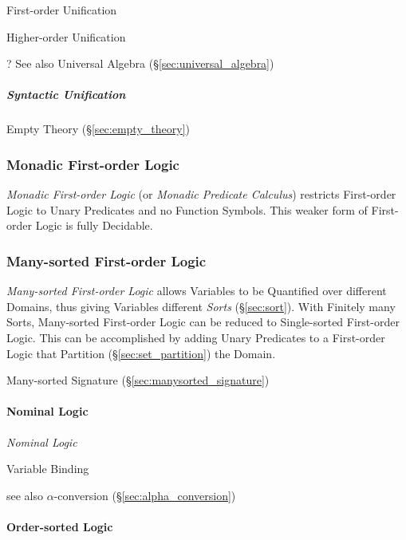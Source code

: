 First-order Unification

Higher-order Unification

\fist ? See also Universal Algebra (\S\ref{sec:universal_algebra})



\subparagraph{Syntactic Unification}\label{sec:syntactic_unification}
\hfill

Empty Theory (\S\ref{sec:empty_theory})



\subsubsection{Monadic First-order Logic}\label{sec:monadic_firstorder}

\emph{Monadic First-order Logic} (or \emph{Monadic Predicate
  Calculus}) restricts First-order Logic to Unary Predicates and no
Function Symbols. This weaker form of First-order Logic is fully
Decidable.



\subsubsection{Many-sorted First-order Logic}
\label{sec:manysorted_logic}

\emph{Many-sorted First-order Logic} allows Variables to be Quantified
over different Domains, thus giving Variables different \emph{Sorts}
(\S\ref{sec:sort}). With Finitely many Sorts, Many-sorted First-order
Logic can be reduced to Single-sorted First-order Logic. This can be
accomplished by adding Unary Predicates to a First-order Logic that
Partition (\S\ref{sec:set_partition}) the Domain.

Many-sorted Signature (\S\ref{sec:manysorted_signature})



\paragraph{Nominal Logic}\label{sec:nominal_logic}\hfill
\emph{Nominal Logic}

Variable Binding

see also $\alpha$-conversion (\S\ref{sec:alpha_conversion})



\paragraph{Order-sorted Logic}\label{sec:order_sorted}\hfill

